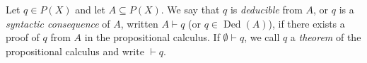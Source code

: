 Let $q \in P(X)$ and let $A \subseteq P(X)$. We say that $q$ is \emph{deducible} from $A$, or $q$ is a \emph{syntactic consequence} of $A$, written $A \vdash q$ (or $q \in \operatorname{Ded}(A)$), if there exists a proof of $q$ from $A$ in the propositional calculus. If $\emptyset \vdash q$, we call $q$ a \emph{theorem} of the propositional calculus and write $\vdash q$.
